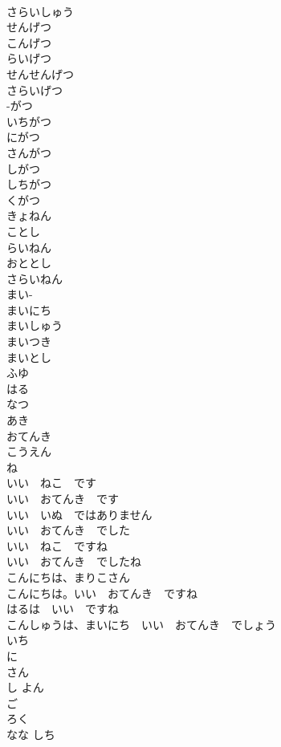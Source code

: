 \documentclass[8pt]{extreport}
\begin{document}
\begin{CJK}{UTF8}{min}
\\	さらいしゅう	
\\	せんげつ	
\\	こんげつ	
\\	らいげつ	
\\	せんせんげつ	
\\	さらいげつ	
\\	-がつ	
\\	いちがつ	
\\	にがつ	
\\	さんがつ	
\\	しがつ	
\\	しちがつ	
\\	くがつ	
\\	きょねん	
\\	ことし	
\\	らいねん	
\\	おととし	
\\	さらいねん	
\\	まい- 
\\	まいにち	
\\	まいしゅう	
\\	まいつき	
\\	まいとし	
\\	ふゆ	
\\	はる	
\\	なつ	
\\	あき	
\\	おてんき	
\\	こうえん	
\\	ね	
\\	いい　ねこ　です	
\\	いい　おてんき　です	
\\	いい　いぬ　ではありません	
\\	いい　おてんき　でした	
\\	いい　ねこ　ですね	
\\	いい　おてんき　でしたね	
\\	こんにちは、まりこさん	
\\	こんにちは。いい　おてんき　ですね	
\\	はるは　いい　ですね	
\\	こんしゅうは、まいにち　いい　おてんき　でしょう	
\\	いち	
\\	に	
\\	さん	
\\	し よん	
\\	ご	
\\	ろく	
\\	なな しち	

\end{CJK}
\end{document}

